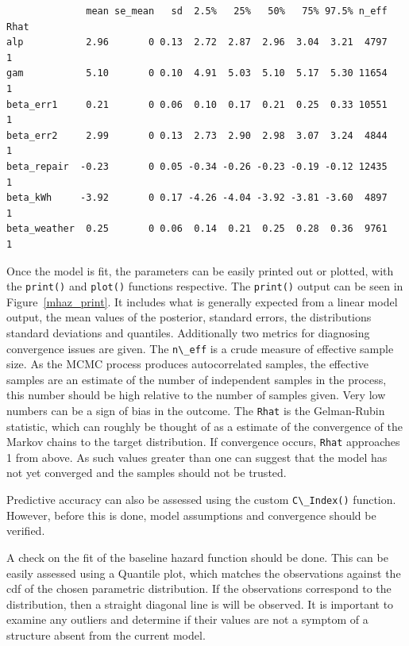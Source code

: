 \begin{lstlisting}
              mean se_mean   sd  2.5%   25%   50%   75% 97.5% n_eff Rhat
alp           2.96       0 0.13  2.72  2.87  2.96  3.04  3.21  4797    1
gam           5.10       0 0.10  4.91  5.03  5.10  5.17  5.30 11654    1
beta_err1     0.21       0 0.06  0.10  0.17  0.21  0.25  0.33 10551    1
beta_err2     2.99       0 0.13  2.73  2.90  2.98  3.07  3.24  4844    1
beta_repair  -0.23       0 0.05 -0.34 -0.26 -0.23 -0.19 -0.12 12435    1
beta_kWh     -3.92       0 0.17 -4.26 -4.04 -3.92 -3.81 -3.60  4897    1
beta_weather  0.25       0 0.06  0.14  0.21  0.25  0.28  0.36  9761    1
    \end{lstlisting}

Once the model is fit, the parameters can be easily printed out or plotted, with the \lstinline{print()} and \lstinline{plot()} functions respective. The \lstinline{print()} output can be seen in Figure~\ref{mhaz_print}. It includes what is generally expected from a linear model output, the mean values of the posterior, standard errors, the distributions standard deviations and quantiles. Additionally two metrics for diagnosing convergence issues are given. The \lstinline{n\_eff} is a crude measure of effective sample size. As the MCMC process produces autocorrelated samples, the effective samples are an estimate of the number of independent samples in the process, this number should be high relative to the number of samples given. Very low numbers can be a sign of bias in the outcome. The \lstinline{Rhat} is the Gelman-Rubin statistic, which can roughly be thought of as a estimate of the convergence of the Markov chains to the target distribution\cite{Gelman1992}. If convergence occurs, \lstinline{Rhat} approaches 1 from above. As such values greater than one can suggest that the model has not yet converged and the samples should not be trusted.

Predictive accuracy can also be assessed using the custom \lstinline{C\_Index()} function. However, before this is done, model assumptions and convergence should be verified. 


A check on the fit of the baseline hazard function should be done. This can be easily assessed using a Quantile plot, which matches the observations against the cdf of the chosen parametric distribution. If the observations correspond to the distribution, then a straight diagonal line is will be observed. It is important to examine any outliers and determine if their values are not a symptom of a structure absent from the current model. 


